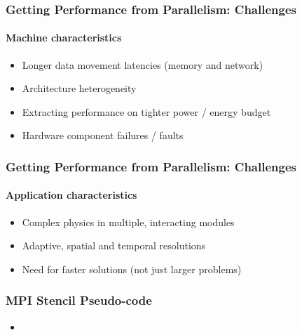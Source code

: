 \begin{frame}[fragile]
  \frametitle{Getting Performance from Parallelism: Challenges}
  \framesubtitle{Machine characteristics}
  \begin{itemize}
  \item Longer data movement latencies (memory and network)
  \item Architecture heterogeneity
  \item Extracting performance on tighter power / energy budget
  \item Hardware component failures / faults
  \end{itemize}
\end{frame}

\begin{frame}[fragile]
  \frametitle{Getting Performance from Parallelism: Challenges}
  \framesubtitle{Application characteristics}
  \begin{itemize}
  \item Complex physics in multiple, interacting modules
  \item Adaptive, spatial and temporal resolutions
  \item Need for faster solutions (not just larger problems)
  \end{itemize}
\end{frame}

\begin{frame}[fragile]
  \frametitle{MPI Stencil Pseudo-code}
  \begin{itemize}
  \item 
  \end{itemize}
\end{frame}
